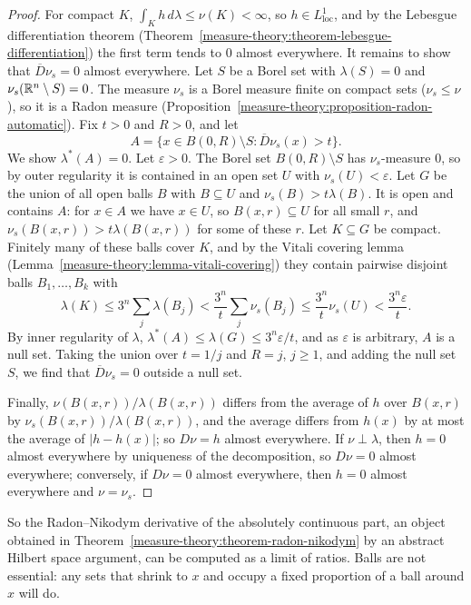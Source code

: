 \begin{proof}
For compact $K$, $\int_Kh\,d\lambda \leq \nu(K) < \infty$, so $h \in L^1_{\mathrm{loc}}$, and by the Lebesgue differentiation theorem
(Theorem~\ref{measure-theory:theorem-lebesgue-differentiation}) the first term tends to $0$ almost everywhere. It remains to show that $\overline{D}\nu_s = 0$ almost everywhere. Let $S$ be a Borel set with
$\lambda(S) = 0$ and $\nu_s(\mathbb{R}^n \setminus S) = 0$. The measure $\nu_s$ is a Borel measure finite on compact sets ($\nu_s \leq \nu$), so it is a Radon measure
(Proposition~\ref{measure-theory:proposition-radon-automatic}). Fix $t > 0$ and $R > 0$, and let
\[
A = \{x \in B(0, R) \setminus S : \overline{D}\nu_s(x) > t\}.
\]
We show $\lambda^*(A) = 0$. Let $\varepsilon > 0$. The Borel set $B(0, R) \setminus S$ has $\nu_s$-measure $0$, so by outer regularity it is contained in an open set $U$ with $\nu_s(U) < \varepsilon$. Let $G$ be
the union of all open balls $B$ with $B \subseteq U$ and $\nu_s(B) > t\lambda(B)$. It is open and contains $A$: for $x \in A$ we have $x \in U$, so $B(x, r) \subseteq U$ for all small $r$, and
$\nu_s(B(x, r)) > t\lambda(B(x, r))$ for some of these $r$. Let $K \subseteq G$ be compact. Finitely many of these balls cover $K$, and by the Vitali covering lemma
(Lemma~\ref{measure-theory:lemma-vitali-covering}) they contain pairwise disjoint balls $B_1, \ldots, B_k$ with
\[
\lambda(K) \leq 3^n\sum_j\lambda(B_j) < \frac{3^n}{t}\sum_j\nu_s(B_j) \leq \frac{3^n}{t}\nu_s(U) < \frac{3^n\varepsilon}{t}.
\]
By inner regularity of $\lambda$, $\lambda^*(A) \leq \lambda(G) \leq 3^n\varepsilon/t$, and as $\varepsilon$ is arbitrary, $A$ is a null set. Taking the union over $t = 1/j$ and $R = j$, $j \geq 1$, and
adding the null set $S$, we find that $\overline{D}\nu_s = 0$ outside a null set.

Finally, $\nu(B(x, r))/\lambda(B(x, r))$ differs from the average of $h$ over $B(x, r)$ by $\nu_s(B(x, r))/\lambda(B(x, r))$, and the average differs from $h(x)$ by at most the average of $|h - h(x)|$; so
$D\nu = h$ almost everywhere. If $\nu \perp \lambda$, then $h = 0$ almost everywhere by uniqueness of the decomposition, so $D\nu = 0$ almost everywhere; conversely, if $D\nu = 0$ almost everywhere,
then $h = 0$ almost everywhere and $\nu = \nu_s$.
\end{proof}

So the Radon--Nikodym derivative of the absolutely continuous part, an object obtained in Theorem~\ref{measure-theory:theorem-radon-nikodym} by an abstract Hilbert space argument, can be computed as a
limit of ratios. Balls are not essential: any sets that shrink to $x$ and occupy a fixed proportion of a ball around $x$ will do.

